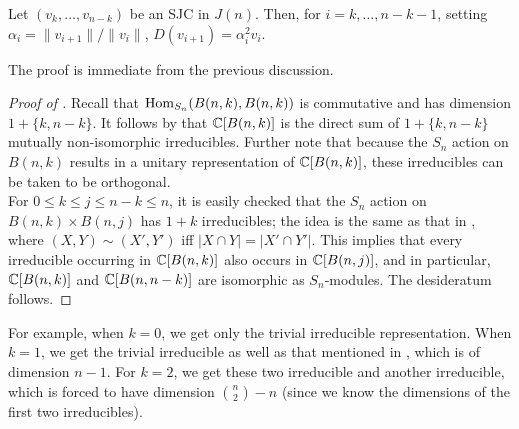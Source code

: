 	\begin{fprop}
		\label{prop:d-on-sjc}
		Let $(v_k,\ldots,v_{n-k})$ be an SJC in $J(n)$. Then, for $i=k,\ldots,n-k-1$, setting $\alpha_i = \|v_{i+1}\|/\|v_i\|$, $D(v_{i+1}) = \alpha_i^2 v_i$.
	\end{fprop}
	The proof is immediate from the previous discussion.

	\begin{proof}[Proof of ]
		Recall that $\operatorname{Hom}_{S_n}(B(n,k),B(n,k))$ is commutative and has dimension $1+\{k,n-k\}$. It follows by  that $\mathbb{C}[B(n,k)]$ is the direct sum of $1+\{k,n-k\}$ mutually non-isomorphic irreducibles. Further note that because the $S_n$ action on $B(n,k)$ results in a unitary representation of $\mathbb{C}[B(n,k)]$, these irreducibles can be taken to be orthogonal. \\
		For $0 \le k \le j \le n-k \le n$, it is easily checked that the $S_n$ action on $B(n,k) \times B(n,j)$ has $1+k$ irreducibles; the idea is the same as that in , where $(X,Y) \sim (X',Y')$ iff $|X \cap Y| = |X' \cap Y'|$. 
		This implies that every irreducible occurring in $\mathbb{C}[B(n,k)]$ also occurs in $\mathbb{C}[B(n,j)]$, and in particular, $\mathbb{C}[B(n,k)]$ and $\mathbb{C}[B(n,n-k)]$ are isomorphic as $S_n$-modules. The desideratum follows.
	\end{proof}

	For example, when $k=0$, we get only the trivial irreducible representation. When $k=1$, we get the trivial irreducible as well as that mentioned in , which is of dimension $n-1$. For $k=2$, we get these two irreducible and another irreducible, which is forced to have dimension $\binom{n}{2} - n$ (since we know the dimensions of the first two irreducibles).

